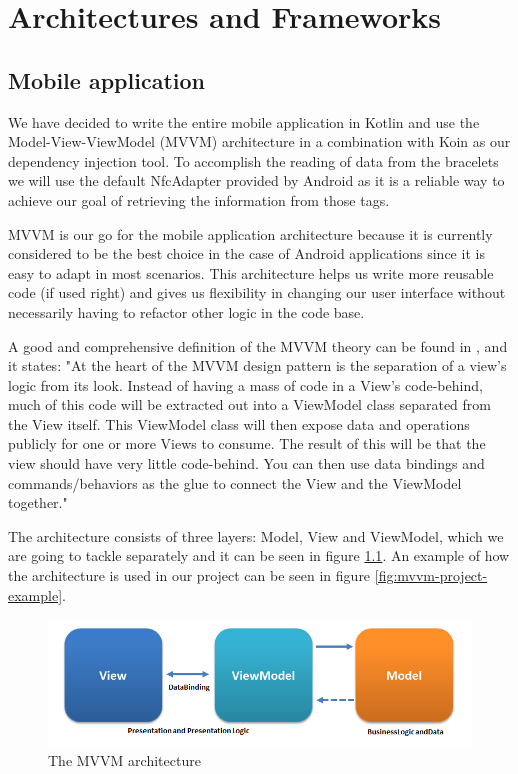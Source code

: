 \chapter{Architectures and Frameworks}
\label{chap:ch3}

\section{Mobile application}
\label{sec:ch3sec1}

\par We have decided to write the entire mobile application in Kotlin and use the Model-View-ViewModel (MVVM) architecture in a combination with Koin as our dependency injection tool. To accomplish the reading of data from the bracelets we will use the default NfcAdapter provided by Android as it is a reliable way to achieve our goal of retrieving the information from those tags.

MVVM is our go for the mobile application architecture because it is currently considered to be the best choice in the case of Android applications since it is easy to adapt in most scenarios. This architecture helps us write more reusable code (if used right) and gives us flexibility in changing our user interface without necessarily having to refactor other logic in the code base.

A good and comprehensive definition of the MVVM theory can be found in \cite{anderson2012model}, and it states: "At the heart of the MVVM design pattern is the separation of a view’s logic from its look. Instead of having a mass of code in a View’s code-behind, much of this code will be extracted out into a ViewModel class separated from the View itself. This ViewModel class will then expose data and operations publicly for one or more Views to consume. The result of this will be that the view should have very little code-behind. You can then use data bindings and commands/behaviors as the glue to connect the View and the ViewModel together."

The architecture consists of three layers: Model, View and ViewModel, which we are going to tackle separately and it can be seen in figure \ref{fig:mvvm}. An example of how the architecture is used in our project can be seen in figure \ref{fig:mvvm-project-example}.

\begin{figure}
\centering
\includegraphics[width=\textwidth]{figures/fig_3_1.png}
\caption{The MVVM architecture \cite{mvvmPattern}}
\label{fig:mvvm}
\end{figure}

